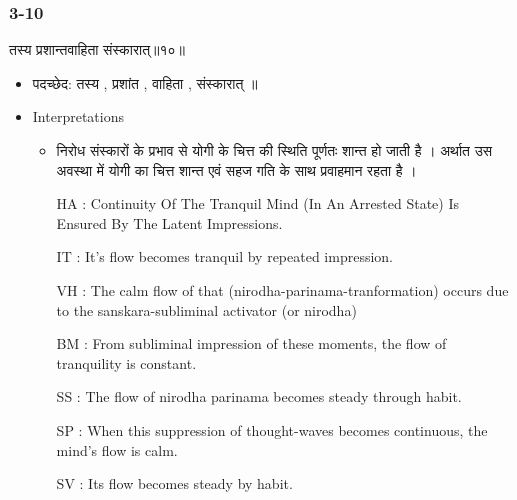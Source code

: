 \begin{frame}[fragile]\frametitle{3-10}
\begin{sanskrit}
तस्य प्रशान्तवाहिता संस्कारात्॥१०॥
\end{sanskrit}

	\begin{itemize}
	\item पदच्छेद: तस्य , प्रशांत‌ , वाहिता , संस्कारात् ‌॥
	\item Interpretations
		\begin{itemize}	
		\item  निरोध संस्कारों के प्रभाव से योगी के चित्त की स्थिति पूर्णतः शान्त हो जाती है । अर्थात उस अवस्था में योगी का चित्त शान्त एवं सहज गति के साथ प्रवाहमान रहता है ।
		\item [HA]: Continuity Of The Tranquil Mind (In An Arrested State) Is Ensured By The Latent Impressions.
		\item [IT]: It’s flow becomes tranquil by repeated impression.
		\item [VH]: The calm flow of that (nirodha-parinama-tranformation) occurs due to the sanskara-subliminal activator (or nirodha)
		\item [BM]: From subliminal impression of these moments, the flow of tranquility is constant.
		\item [SS]: The flow of nirodha parinama becomes steady through habit.
		\item [SP]: When this suppression of thought-waves becomes continuous, the mind’s flow is calm.
		\item [SV]: Its flow becomes steady by habit. 
		\end{itemize}
	\end{itemize}
\end{frame}



